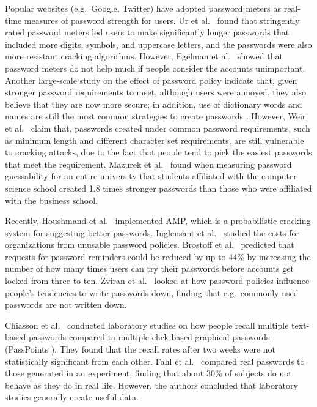 \documentclass[conference]{IEEEtran}
\begin{document}
Popular websites (e.g.~Google, Twitter) have adopted password meters as real-time measures of password strength for users. Ur et al.~\cite{Ur:2012:YPM:2362793.2362798} found that stringently rated password meters led users to make significantly longer passwords that included more digits, symbols, and uppercase letters, and the passwords were also more resistant cracking algorithms. However, Egelman et al.~\cite{Egelman:2013:MPG:2470654.2481329} showed that password meters do not help much if people consider the accounts unimportant. Another large-scale study on the effect of password policy indicate that, given stronger password requirements to meet, although users were annoyed, they also believe that they are now more secure; in addition, use of dictionary words and names are still the most common strategies to create passwords \cite{Shay:2010:ESP:1837110.1837113}. However, Weir et al.~\cite{Weir:2010:TMP:1866307.1866327} claim that, passwords created under common password requirements, such as minimum length and different character set requirements, are still vulnerable to cracking attacks, due to the fact that people tend to pick the easiest passwords that meet the requirement. Mazurek et al.~\cite{Mazurek:2013:MPG:2508859.2516726} found when measuring password guessability for an entire university that students affiliated with the computer science school created 1.8 times stronger passwords than those who were affiliated with the business school.


Recently, Houshmand et al.~\cite{Houshmand:2012:BBP:2420950.2420966} implemented AMP, which is a probabilistic cracking system for suggesting better passwords.  Inglensant et al.~\cite{Inglesant:2010:TCU:1753326.1753384} studied the costs for organizations from unusable password policies. Brostoff et al.~\cite{BroSas2003} predicted that requests for password reminders could be reduced by up to 44\% by increasing the number of how many times users can try their passwords before accounts get locked from three to ten. Zviran et al.~\cite{Zviran:1999:PSE:1189462.1189470} looked at how password policies influence people's tendencies to write passwords down, finding that e.g.~commonly used passwords are not written down. 

Chiasson et al.~\cite{Chiasson:2009:MPI:1653662.1653722} conducted laboratory studies on how people recall multiple text-based passwords compared to multiple click-based graphical passwords (PassPoints \cite{Wiedenbeck:2005:PDL:1090412.1090418}). They found that the recall rates after two weeks were not statistically significant from each other. Fahl et al.~\cite{Fahl:2013:EVP:2501604.2501617} compared real passwords to those generated in an experiment, finding that about 30\% of subjects do not behave as they do in real life. However, the authors concluded that laboratory studies generally create useful data. 
\end{document}
